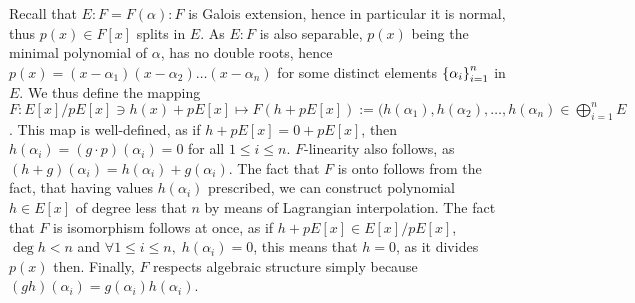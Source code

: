 \documentclass[8pt,fleqn]{article} %
\begin{document}
\begin{enumerate}[label=\bfseries Problem \arabic*.]
		Recall that $E:F=F(\alpha):F$ is Galois extension, hence in particular it is normal, thus $p(x)\in F[x]$ splits in $E$. As $E:F$
		is also separable, $p(x)$ being the minimal polynomial of $\alpha$, has no double roots, hence $p(x)=(x-\alpha_1)(x-\alpha_2)\hdots
		(x-\alpha_n)$ for some distinct elements $\left\{\alpha_i\right\}_{i=1}^n$ in $E$.
		We thus define the mapping $F:E[x]/pE[x]\ni h(x)+pE[x]\mapsto F(h+pE[x]):=(h(\alpha_1),h(\alpha_2),\hdots,h(\alpha_n)\in \bigoplus_
		{i=1}^n E$. This map is well-defined, as if $h+pE[x]=0+pE[x]$, then $h(\alpha_i)=(g\cdot p)(\alpha_i)=0$ for all $1\leq i\leq n$.
		$F$-linearity also follows, as $(h+g)(\alpha_i)=h(\alpha_i)+g(\alpha_i)$. The fact that $F$ is onto follows from the fact,
		that having values $h(\alpha_i)$ prescribed, we can construct polynomial $h\in E[x]$ of degree less that $n$ by means of Lagrangian
		interpolation. The fact that $F$ is isomorphism follows at once, as if $h+pE[x]\in E[x]/pE[x]$, $\deg h<n$ and $\forall 1\leq i\leq
		n,\; h(\alpha_i)=0$, this means that $h=0$, as it divides $p(x)$ then. Finally, $F$ respects algebraic structure simply
		because $(gh)(\alpha_i)=g(\alpha_i)h(\alpha_i)$.


\end{enumerate}
\end{document}
